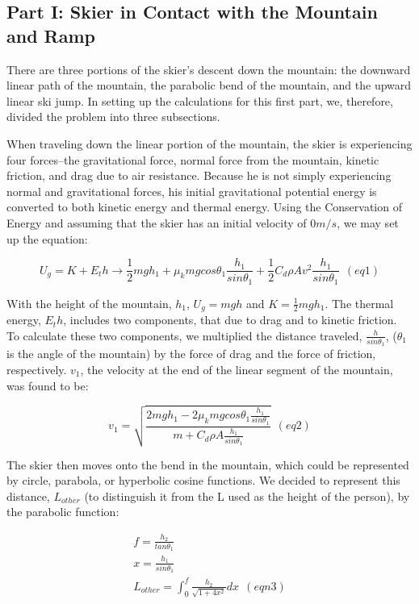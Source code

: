\documentclass[]{IEEEphot}
\begin{document}
\subsection{Part I: Skier in Contact with the Mountain and Ramp}

There are three portions of the skier’s descent down the mountain: the downward linear path of the mountain, the parabolic bend of the mountain, and the upward linear ski jump. In setting up the calculations for this first part, we, therefore, divided the problem into three subsections.

When traveling down the linear portion of the mountain, the skier is experiencing four forces--the gravitational force, normal force from the mountain, kinetic friction, and drag due to air resistance. Because he is not simply experiencing normal and gravitational forces, his initial gravitational potential energy is converted to both kinetic energy and thermal energy. Using the Conservation of Energy and assuming that the skier has an initial velocity of $0 m/s$, we may set up the equation:

\[
	U_g = K + E_th \rightarrow \frac{1}{2}mgh_1 + \mu_k mgcos\theta_1 \frac{h_1}{sin\theta_1} + \frac{1}{2}C_d\rho Av^2 \frac{h_1}{sin\theta_1}   \ \         (eq 1)
\]

With the height of the mountain, $h_1$, $U_g = mgh$ and $K = \frac{1}{2} mgh_1$. The thermal energy, $E_th$, includes two components, that due to drag and to kinetic friction. To calculate these two components, we multiplied the distance traveled, $\frac{h}{sin\theta_1}$, ($\theta_1$ is the angle of the mountain)  by the force of drag and the force of friction, respectively. $v_1$, the velocity at the end of the linear segment of the mountain, was found to be:

\[
	v_1 = \sqrt{\frac{2mgh_1 - 2\mu_k mgcos\theta_1 \frac{h_1}{sin\theta_1}}{m + C_d\rho A\frac{h_1}{sin\theta_1}}} \ \ (eq 2)
\]

The skier then moves onto the bend in the mountain, which could be represented by circle, parabola, or hyperbolic cosine functions. We decided to represent this distance, $L_{other}$ (to distinguish it from the L used as the height of the person), by the parabolic function:

\begin{eqnarray}
f = \frac{h_2}{tan\theta_1}\nonumber\\
x = \frac{h_1}{sin\theta_1} \nonumber\\
L_{other} = \int_0^f \frac{h_2}{\sqrt{1 + 4x^2}} dx \ \ (eqn 3) \nonumber
\end{eqnarray}
\end{document}

